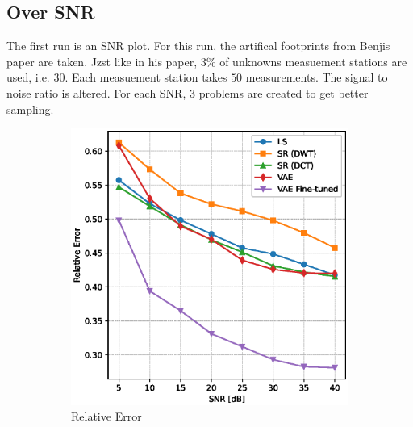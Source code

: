 \subsection{Over SNR}
The first run is an SNR plot.
For this run, the artifical footprints from Benjis paper are taken.
Jzst like in his paper, $3\%$ of unknowns measuement stations are used, i.e. 30.
Each measuement station takes $50$ measurements.
The signal to noise ratio is altered.
For each SNR, 3 problems are created to get better sampling.
\begin{figure}
    \centering
    \begin{subfigure}[b]{0.49\textwidth}
        \includegraphics[width=\textwidth]{figures/06_results/snr_plots/munich_relative_error.eps}
        \caption{Relative Error}
    \end{subfigure}
    \begin{subfigure}[b]{0.49\textwidth}

\end{subfigure}
\end{figure}
